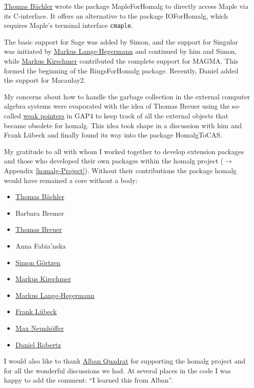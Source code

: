 \documentclass[a4paper,11pt]{report}
\begin{document}
{ \href{http://wwwb.math.rwth-aachen.de/~thomas/} {Thomas
  Bächler}  wrote the package \textsf{MapleForHomalg} to directly access \textsf{Maple} via its \textsf{C}-interface. It offers an alternative to the package \textsf{IO{\textunderscore}ForHomalg}, which requires \textsf{Maple}'s terminal interface \texttt{cmaple}. 

 The basic support for \textsf{Sage} was added by Simon, and the support for \textsf{Singular} was initiated by  \href{http://wwwb.math.rwth-aachen.de/~markus/} {Markus
  Lange-Hegermann} and continued by him and Simon, while  \href{http://www.math.rwth-aachen.de/~Markus.Kirschmer/} {Markus
  Kirschmer} contributed the complete support for \textsf{MAGMA}. This formed the beginning of the \textsf{RingsForHomalg} package. Recently, Daniel added the support for \textsf{Macaulay2}. 

 My concerns about how to handle the garbage collection in the external
computer algebra systems were evaporated with the idea of Thomas Breuer using
the so-called \href{http://www.gap-system.org/Manuals/doc/ref/chap86.html} {weak
  pointers}  in \textsf{GAP4} to keep track of all the external objects that became obsolete for \textsf{homalg}. This idea took shape in a discussion with him and Frank L{\"u}beck and
finally found its way into the package \textsf{HomalgToCAS}. 

 My gratitude to all with whom I worked together to develop extension packages
and those who developed their own packages within the \textsf{homalg} project ($\to$ Appendix \ref{homalg-Project}). Without their contributions the package \textsf{homalg} would have remained a core without a body: 
\begin{itemize}
\item \href{http://wwwb.math.rwth-aachen.de/~thomas/} {Thomas Bächler}
\item Barbara Bremer
\item \href{http://www.math.rwth-aachen.de/~Thomas.Breuer/} {Thomas Breuer}
\item Anna Fabia{\a'n}ska
\item \href{http://wwwb.math.rwth-aachen.de/goertzen/} {Simon Görtzen}
\item \href{http://www.math.rwth-aachen.de/~Markus.Kirschmer/} {Markus Kirschmer}
\item \href{http://wwwb.math.rwth-aachen.de/~markus/} {Markus Lange-Hegermann}
\item \href{http://www.math.rwth-aachen.de/~Frank.Luebeck/} {Frank Lübeck}
\item \href{http://www-groups.mcs.st-and.ac.uk/~neunhoef/} {Max Neunhöffer}
\item \href{http://wwwb.math.rwth-aachen.de/~daniel/} {Daniel Robertz}
\end{itemize}
 I would also like to thank  \href{http://www-sop.inria.fr/members/Alban.Quadrat/} {Alban
  Quadrat} for supporting the \textsf{homalg} project and for all the wonderful discussions we had. At several places in the
code I was happy to add the comment: ``I learned this from Alban''. 

}
\end{document}
